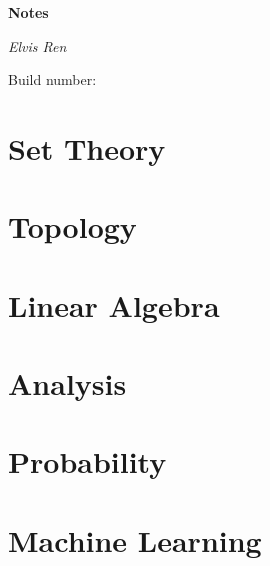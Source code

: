 





\begin{titlepage}
    \centering
    \vspace*{5cm}
    {\Huge\bfseries Notes\par}
    \vspace*{0.5cm}
    {\Large\itshape Elvis Ren\par}
    \vspace{0.5cm}
    {\Large Build number: \buildnumber\par}
    \vspace{0.5cm}
    {\large \DTMnow\par}
\end{titlepage}



\tableofcontents


\part{Set Theory}


\part{Topology}


\part{Linear Algebra}


\part{Analysis}


\part{Probability}


\part{Machine Learning}



